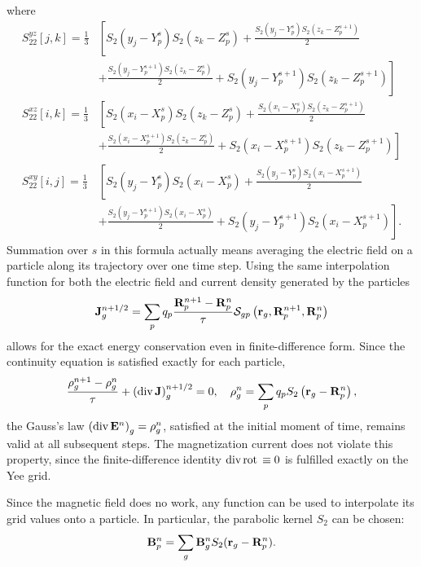 \documentclass[final,3p]{elsarticle}
\newcommand{\rot}{\mbox{\rm{rot\,}}}
\newcommand{\diverg}{\mbox{\rm{div\,}}}
\begin{document}
where
\begin{align}
	S_{22}^{yz}[j,k]=\frac{1}{3}&\left[S_2\left(y_j-Y_p^s\right)S_2\left(z_k-Z_p^s\right)+\frac{S_2\left(y_j-Y_p^s\right)S_2\left(z_k-Z_p^{s+1}\right)}{2} \right.  \nonumber \\
	&\left. +\frac{S_2\left(y_j-Y_p^{s+1}\right)S_2\left(z_k-Z_p^{s}\right)}{2}+S_2\left(y_j-Y_p^{s+1}\right)S_2\left(z_k-Z_p^{s+1}\right)\right] \\
	S_{22}^{xz}[i,k]=\frac{1}{3}&\left[S_2\left(x_i-X_p^s\right)S_2\left(z_k-Z_p^s\right)+\frac{S_2\left(x_i-X_p^s\right)S_2\left(z_k-Z_p^{s+1}\right)}{2} \right.  \nonumber \\
	&\left. +\frac{S_2\left(x_i-X_p^{s+1}\right)S_2\left(z_k-Z_p^{s}\right)}{2}+S_2\left(x_i-X_p^{s+1}\right)S_2\left(z_k-Z_p^{s+1}\right)\right]  \\
	S_{22}^{xy}[i,j]=\frac{1}{3}&\left[S_2\left(y_j-Y_p^s\right)S_2\left(x_i-X_p^s\right)+\frac{S_2\left(y_j-Y_p^s\right)S_2\left(x_i-X_p^{s+1}\right)}{2} \right.  \nonumber \\
	&\left. +\frac{S_2\left(y_j-Y_p^{s+1}\right)S_2\left(x_i-X_p^{s}\right)}{2}+S_2\left(y_j-Y_p^{s+1}\right)S_2\left(x_i-X_p^{s+1}\right)\right].
\end{align}
Summation over $s$ in this formula actually means averaging the electric field on a particle along its trajectory over one time step. Using the same interpolation function for both the electric field and current density generated by the particles
\begin{equation}\label{jf}
	{\bf J}_g^{n+1/2}=\sum\limits_p q_p \frac{{\bf R}_p^{n+1}-{\bf R}_p^{n}}{\tau} {\bf \mathcal{S}}_{gp}\left({\bf r}_g,{\bf R}_p^{n+1},{\bf R}_p^{n}\right)
\end{equation}
allows for the exact energy conservation even in finite-difference form. Since the continuity equation is satisfied exactly for each particle, 
\begin{equation}\label{cont}
	\frac{\rho_g^{n+1}-\rho_g^{n}}{\tau}+\left(\diverg {\bf J}\right)_g^{n+1/2}=0, \quad \rho_g^{n}=\sum\limits_p q_p S_2\left({\bf r}_g-{\bf R}_p^{n}\right),
\end{equation}
the Gauss's law $\left(\diverg {\bf E}^n\right)_g=\rho_g^n$, satisfied at the initial moment of time, remains valid at all subsequent steps. The magnetization current does not violate this property, since the finite-difference identity $\diverg\rot\equiv 0$ is fulfilled exactly on the Yee grid.


Since the magnetic field does no work, any function can be used to interpolate its grid values onto a particle. In particular, the parabolic kernel $S_2$ can be chosen:
\begin{equation}\label{bf}
	{\bf B}_p^n=\sum\limits_g {\bf B}_g^n S_2({\bf r}_g-{\bf R}_p^n).
\end{equation}
\end{document}
